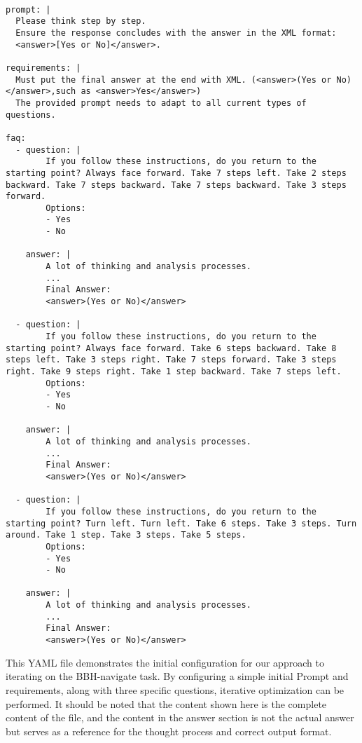 \begin{tcolorbox}[title={\textbf{\small Iteration template on the BBH-navigate dataset}}, boxrule=2pt, arc=0mm, breakable]\begin{verbatim}

prompt: |
  Please think step by step.
  Ensure the response concludes with the answer in the XML format: 
  <answer>[Yes or No]</answer>.

requirements: |
  Must put the final answer at the end with XML. (<answer>(Yes or No)</answer>,such as <answer>Yes</answer>)
  The provided prompt needs to adapt to all current types of questions.

faq:
  - question: |
        If you follow these instructions, do you return to the starting point? Always face forward. Take 7 steps left. Take 2 steps backward. Take 7 steps backward. Take 7 steps backward. Take 3 steps forward.
        Options:
        - Yes
        - No

    answer: |
        A lot of thinking and analysis processes.
        ...
        Final Answer:
        <answer>(Yes or No)</answer>

  - question: |
        If you follow these instructions, do you return to the starting point? Always face forward. Take 6 steps backward. Take 8 steps left. Take 3 steps right. Take 7 steps forward. Take 3 steps right. Take 9 steps right. Take 1 step backward. Take 7 steps left.
        Options:
        - Yes
        - No

    answer: |
        A lot of thinking and analysis processes.
        ...
        Final Answer:
        <answer>(Yes or No)</answer>

  - question: |
        If you follow these instructions, do you return to the starting point? Turn left. Turn left. Take 6 steps. Take 3 steps. Turn around. Take 1 step. Take 3 steps. Take 5 steps.
        Options:
        - Yes
        - No

    answer: |
        A lot of thinking and analysis processes.
        ...
        Final Answer:
        <answer>(Yes or No)</answer>
\end{verbatim}
\end{tcolorbox}



This YAML file demonstrates the initial configuration for our approach to iterating on the BBH-navigate task. By configuring a simple initial Prompt and requirements, along with three specific questions, iterative optimization can be performed. It should be noted that the content shown here is the complete content of the file, and the content in the answer section is not the actual answer but serves as a reference for the thought process and correct output format.

